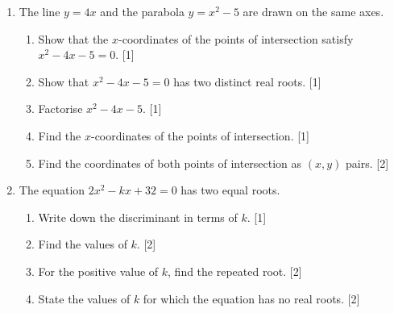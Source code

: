 \documentclass[12pt, twoside]{article}
\begin{document}
\begin{enumerate}[itemsep=0.15cm]
\newpage

\item[3.] [Maximum mark: 6]

The line $y = 4x$ and the parabola $y = x^2 - 5$ are drawn
on the same axes.

\begin{enumerate}[itemsep=0.15cm]
  \item Show that the $x$-coordinates of the points of intersection
  satisfy \\[0.25cm]
  $x^2 - 4x - 5 = 0$. \hfill [1]
  \item Show that $x^2 - 4x - 5=0$ has two distinct real roots. \hfill [1]
  \item Factorise $x^2 - 4x - 5$. \hfill [1]
  \item Find the $x$-coordinates of the points of intersection. \hfill [1]
  \item Find the coordinates of both points of intersection as $(x, y)$ pairs. \hfill [2]
\end{enumerate}


\newpage

\item[4.] [Maximum mark: 7]

The equation $2x^2 - kx + 32 = 0$ has two equal roots.

\begin{enumerate}[itemsep=0.15cm]
  \item Write down the discriminant in terms of $k$. \hfill [1]
  \item Find the values of $k$. \hfill [2]
  \item For the positive value of $k$, find the repeated root. \hfill [2]
  \item State the values of $k$ for which the equation has no
  real roots. \hfill [2]
\end{enumerate}


\end{enumerate}
\end{document}
